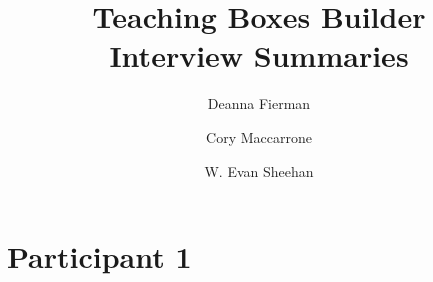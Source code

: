 \documentclass[11pt,letter]{article}
\title{Teaching Boxes Builder \\ Interview Summaries}
\author{Deanna Fierman \and Cory Maccarrone \and W. Evan Sheehan}
\begin{document}
\begin{titlepage}
	\maketitle
	\thispagestyle{empty}
\end{titlepage}

\hfill
\thispagestyle{empty}
\pagebreak
\setcounter{page}{0}

\section*{Participant 1}
\end{document}
